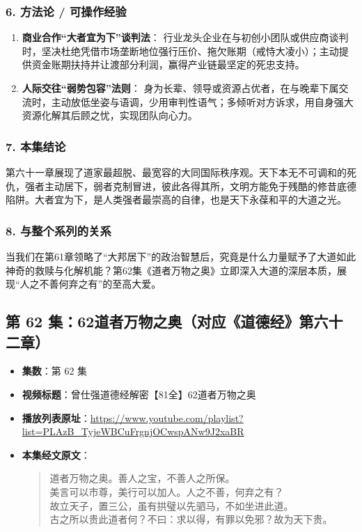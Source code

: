 \subsubsection{6. 方法论 / 可操作经验}
\begin{enumerate}
    \item \textbf{商业合作“大者宜为下”谈判法}：
    行业龙头企业在与初创小团队或供应商谈判时，坚决杜绝凭借市场垄断地位强行压价、拖欠账期（戒恃大凌小）；主动提供资金账期扶持并让渡部分利润，赢得产业链最坚定的死忠支持。
    \item \textbf{人际交往“弱势包容”法则}：
    身为长辈、领导或资源占优者，在与晚辈下属交流时，主动放低坐姿与语调，少用审判性语气；多倾听对方诉求，用自身强大资源化解其后顾之忧，实现团队向心力。
\end{enumerate}

\subsubsection{7. 本集结论}
第六十一章展现了道家最超脱、最宽容的大同国际秩序观。天下本无不可调和的死仇，强者主动居下，弱者克制冒进，彼此各得其所，文明方能免于残酷的修昔底德陷阱。大者宜为下，是人类强者最崇高的自律，也是天下永葆和平的大道之光。

\subsubsection{8. 与整个系列的关系}
当我们在第61章领略了“大邦居下”的政治智慧后，究竟是什么力量赋予了大道如此神奇的救赎与化解机能？第62集《道者万物之奥》立即深入大道的深层本质，展现“人之不善何弃之有”的至高大爱。

\clearpage

\subsection{第 62 集：62道者万物之奥（对应《道德经》第六十二章）}
\label{sec:ep62}

\begin{itemize}
    \item \textbf{集数}：第 62 集
    \item \textbf{视频标题}：曾仕强道德经解密【81全】62道者万物之奥
    \item \textbf{播放列表原址}：\url{https://www.youtube.com/playlist?list=PLAzB_TyjeWBCuFrgnjOCwspANw9J2xaBR}
    \item \textbf{本集经文原文}：
    \begin{quote}\kaishu
    道者万物之奥。善人之宝，不善人之所保。\\
    美言可以市尊，美行可以加人。人之不善，何弃之有？\\
    故立天子，置三公，虽有拱璧以先驷马，不如坐进此道。\\
    古之所以贵此道者何？不曰：求以得，有罪以免邪？故为天下贵。
    \end{quote}
\end{itemize}

